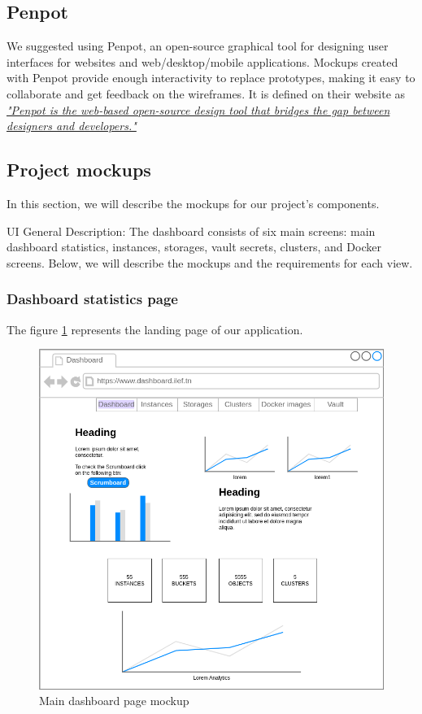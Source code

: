 \subsection{Penpot}
We suggested using Penpot, an open-source graphical tool for designing user interfaces for websites and
web/desktop/mobile applications. Mockups created with Penpot provide enough interactivity to replace prototypes,
making it easy to collaborate and get feedback on the wireframes. It is defined on their website as \href{https://penpot.app/}{\textit{"Penpot is the web-based open-source design tool that bridges the gap between designers and developers."}}


\subsection{Project mockups}
In this section, we will describe the mockups for our project’s components.

UI General Description:
The dashboard consists of six main screens: main dashboard statistics, instances, storages, vault secrets, clusters, and Docker screens. Below, we will describe the mockups and the requirements for each view.

\subsubsection{Dashboard statistics page}

The figure \hyperref[fig:mockup-dashboard]{\ref{fig:mockup-dashboard}} represents the landing page of our application.
\begin{figure}[h]
  \center
  \includegraphics[width=13cm]{mockup-dashboard.png}
  \caption{Main dashboard page mockup}
  \label{fig:mockup-dashboard}
\end{figure}
\vspace{50mm}

